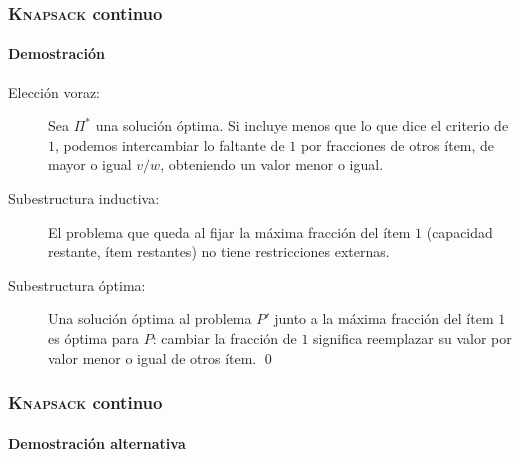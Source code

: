 \documentclass[english, spanish, fleqn,%
hyperref = {colorlinks, urlcolor = blue}%
]{beamer}
\begin{document}
\begin{frame}
  \setcounter{beamerpauses}{2}
  \frametitle{\textsc{Knapsack} continuo}
  \framesubtitle{Demostración}

  \begin{description}
  \item[Elección voraz:]
    Sea \(\Pi^*\) una solución óptima.
    Si incluye menos que lo que dice el criterio de \(1\),
    podemos intercambiar lo faltante de \(1\) por fracciones de otros ítem,
    de mayor o igual \(v / w\),
    obteniendo un valor menor o igual.
  \item[Subestructura inductiva:]
    El problema que queda al fijar la máxima fracción del ítem \(1\)
    (capacidad restante,
     ítem restantes)
    no tiene restricciones externas.
  \item[Subestructura óptima:]
    Una solución óptima al problema \(P'\)
    junto a la máxima fracción del ítem \(1\)
    es óptima para \(P\):
    cambiar la fracción de \(1\) significa reemplazar su valor
    por valor menor o igual de otros ítem.
    \qed
  \end{description}
\end{frame}

\begin{frame}
  \setcounter{beamerpauses}{2}
  \frametitle{\textsc{Knapsack} continuo}
  \framesubtitle{Demostración alternativa}


\end{frame}
\end{document}
